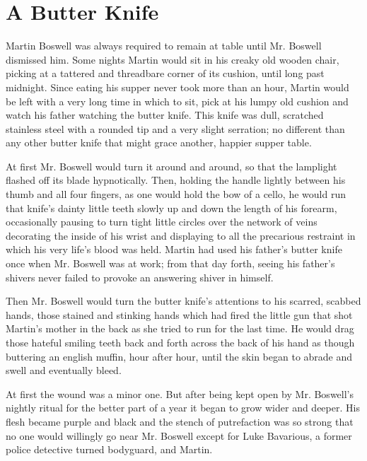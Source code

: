 \chapter{A Butter Knife}




Martin Boswell was always required to remain at table until Mr.
Boswell dismissed him. Some nights Martin would sit in his creaky
old wooden chair, picking at a tattered and threadbare corner of
its cushion, until long past midnight. Since eating his supper
never took more than an hour, Martin would be left with a very long
time in which to sit, pick at his lumpy old cushion and watch his
father watching the butter knife. This knife was dull, scratched
stainless steel with a rounded tip and a very slight serration; no
different than any other butter knife that might grace another,
happier supper table.



At first Mr. Boswell would turn it around and around, so that the
lamplight flashed off its blade hypnotically. Then, holding the
handle lightly between his thumb and all four fingers, as one would
hold the bow of a cello, he would run that knife's dainty little
teeth slowly up and down the length of his forearm, occasionally
pausing to turn tight little circles over the network of veins
decorating the inside of his wrist and displaying to all the
precarious restraint in which his very life's blood was held.
Martin had used his father's butter knife once when Mr. Boswell was
at work; from that day forth, seeing his father's shivers never
failed to provoke an answering shiver in himself.



Then Mr. Boswell would turn the butter knife's attentions to his
scarred, scabbed hands, those stained and stinking hands which had
fired the little gun that shot Martin's mother in the back as she
tried to run for the last time. He would drag those hateful smiling
teeth back and forth across the back of his hand as though
buttering an english muffin, hour after hour, until the skin began
to abrade and swell and eventually bleed.



At first the wound was a minor one. But after being kept open by
Mr. Boswell's nightly ritual for the better part of a year it began
to grow wider and deeper. His flesh became purple and black and the
stench of putrefaction was so strong that no one would willingly go
near Mr. Boswell except for Luke Bavarious, a former police
detective turned bodyguard, and Martin.



